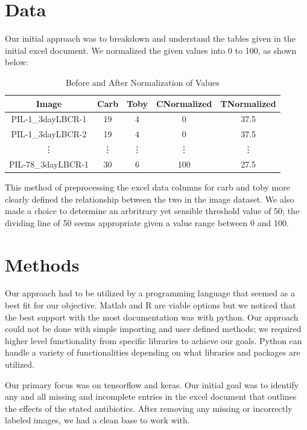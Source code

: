 \documentclass[conference]{IEEEtran}
\begin{document}
\section{Data}
Our initial approach was to breakdown and understand the tables given in the initial excel document. We normalized the given values into 0 to 100, as shown below: 
\begin{table}[h]
\begin{center}
\begin{tabular}{| c | c | c | c | c |}
\hline
Image & Carb & Toby & CNormalized & TNormalized\\ \hline \hline
PIL-1\_3dayLBCR-1 & 19 & 4 & 0 & 37.5\\ \hline
PIL-1\_3dayLBCR-2 & 19 & 4 & 0 & 37.5\\ \hline
\vdots & \vdots & \vdots & \vdots & \vdots\\ \hline
PIL-78\_3dayLBCR-1 & 30 & 6 & 100 & 27.5\\ \hline
\end{tabular}
\caption{Before and After Normalization of Values}
\label{tabDeliverable}
\end{center}
\end{table}


This method of preprocessing the excel data columns for carb and toby more clearly defined the relationship between the two in the image dataset. We also made a choice to determine an arbritrary yet sensible threshold value of 50; the dividing line of 50 seems appropriate given a value range between 0 and 100.

\section{Methods}
Our approach had to be utilized by a programming language that seemed as a best fit for our objective. Matlab and R are viable options but we noticed that the best support with the most documentation was with python. Our approach could not be done with simple importing and user defined methods; we required higher level functionality from specific libraries to achieve our goals. Python can handle a variety of functionalities depending on what libraries and packages are utilized. 

Our primary focus was on tensorflow and keras. Our initial goal was to identify any and all missing and incomplete entries in the excel document that outlines the effects of the stated antibiotics. After removing any missing or incorrectly labeled images, we had a clean base to work with.
\end{document}
